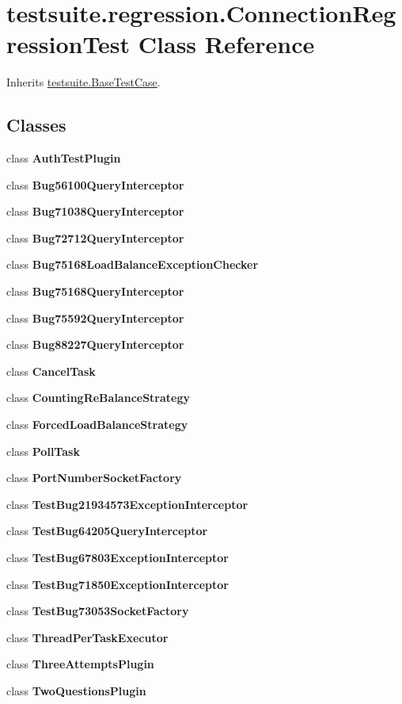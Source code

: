 \hypertarget{classtestsuite_1_1regression_1_1_connection_regression_test}{}\section{testsuite.\+regression.\+Connection\+Regression\+Test Class Reference}
\label{classtestsuite_1_1regression_1_1_connection_regression_test}


Inherits \mbox{\hyperlink{classtestsuite_1_1_base_test_case}{testsuite.\+Base\+Test\+Case}}.

\subsection*{Classes}
\begin{DoxyCompactItemize}
\item 
class {\bfseries Auth\+Test\+Plugin}
\item 
class {\bfseries Bug56100\+Query\+Interceptor}
\item 
class {\bfseries Bug71038\+Query\+Interceptor}
\item 
class {\bfseries Bug72712\+Query\+Interceptor}
\item 
class {\bfseries Bug75168\+Load\+Balance\+Exception\+Checker}
\item 
class {\bfseries Bug75168\+Query\+Interceptor}
\item 
class {\bfseries Bug75592\+Query\+Interceptor}
\item 
class {\bfseries Bug88227\+Query\+Interceptor}
\item 
class {\bfseries Cancel\+Task}
\item 
class {\bfseries Counting\+Re\+Balance\+Strategy}
\item 
class {\bfseries Forced\+Load\+Balance\+Strategy}
\item 
class {\bfseries Poll\+Task}
\item 
class {\bfseries Port\+Number\+Socket\+Factory}
\item 
class {\bfseries Test\+Bug21934573\+Exception\+Interceptor}
\item 
class {\bfseries Test\+Bug64205\+Query\+Interceptor}
\item 
class {\bfseries Test\+Bug67803\+Exception\+Interceptor}
\item 
class {\bfseries Test\+Bug71850\+Exception\+Interceptor}
\item 
class {\bfseries Test\+Bug73053\+Socket\+Factory}
\item 
class {\bfseries Thread\+Per\+Task\+Executor}
\item 
class {\bfseries Three\+Attempts\+Plugin}
\item 
class {\bfseries Two\+Questions\+Plugin}
\end{DoxyCompactItemize}

